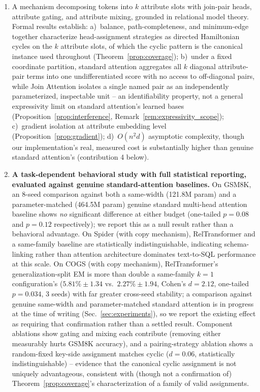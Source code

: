 \documentclass[review]{elsarticle}
\begin{document}
\begin{enumerate}[noitemsep,topsep=2pt]
  \item A mechanism decomposing tokens into $k$ attribute slots with join-pair heads, attribute gating, and attribute mixing, grounded in relational model theory. Formal results establish: a)~balance, path-completeness, and minimum-edge together characterize head-assignment strategies as directed Hamiltonian cycles on the $k$ attribute slots, of which the cyclic pattern is the canonical instance used throughout (Theorem~\ref{prop:coverage}); b)~under a fixed coordinate partition, standard attention aggregates all $k$ diagonal attribute-pair terms into one undifferentiated score with no access to off-diagonal pairs, while Join Attention isolates a single named pair as an independently parameterized, inspectable unit -- an identifiability property, not a general expressivity limit on standard attention's learned bases (Proposition~\ref{prop:interference}, Remark~\ref{rem:expressivity_scope}); c)~gradient isolation at attribute embedding level (Proposition~\ref{prop:gradient}); d)~$O(n^2d)$ asymptotic complexity, though our implementation's real, measured cost is substantially higher than genuine standard attention's (contribution 4 below).

  \item \textbf{A task-dependent behavioral study with full statistical reporting, evaluated against genuine standard-attention baselines.} On GSM8K, an 8-seed comparison against both a same-width (121.8M param) and a parameter-matched (464.5M param) genuine standard multi-head attention baseline shows \emph{no} significant difference at either budget (one-tailed $p{=}0.08$ and $p{=}0.12$ respectively); we report this as a null result rather than a behavioral advantage. On Spider (with copy mechanism), RelTransformer and a same-family baseline are statistically indistinguishable, indicating schema-linking rather than attention architecture dominates text-to-SQL performance at this scale. On COGS (with copy mechanism), RelTransformer's generalization-split EM is more than double a same-family $k{=}1$ configuration's ($5.81\%{\pm}1.34$ vs.\ $2.27\%{\pm}1.94$, Cohen's $d{=}2.12$, one-tailed $p{=}0.034$, 3 seeds) with far greater cross-seed stability; a comparison against genuine same-width and parameter-matched standard attention is in progress at the time of writing (Sec.~\ref{sec:experiments}), so we report the existing effect as requiring that confirmation rather than a settled result. Component ablations show gating and mixing each contribute (removing either measurably hurts GSM8K accuracy), and a pairing-strategy ablation shows a random-fixed key-side assignment matches cyclic ($d{=}0.06$, statistically indistinguishable) -- evidence that the canonical cyclic assignment is not uniquely advantageous, consistent with (though not a confirmation of) Theorem~\ref{prop:coverage}'s characterization of a family of valid assignments.


\end{enumerate}
\end{document}
